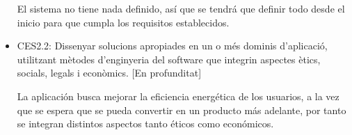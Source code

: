 \begin{itemize}
El sistema no tiene nada definido, así que se tendrá que definir todo desde el inicio para que cumpla los requisitos establecidos.
\item CES2.2: Dissenyar solucions apropiades en un o més dominis d'aplicació, utilitzant mètodes d'enginyeria del software que integrin aspectes ètics, socials, legals i econòmics. [En profunditat]

La aplicación busca mejorar la eficiencia energética de los usuarios, a la vez que se espera que se pueda convertir en un producto más adelante, por tanto se integran distintos aspectos tanto éticos como económicos.
\end{itemize}
